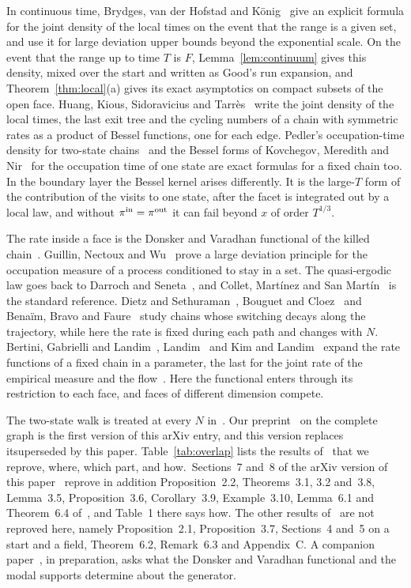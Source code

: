 In continuous time, Brydges, van der Hofstad and K\"onig~\cite{bhk2007} give an
explicit formula for the joint density of the local times on the event that the
range is a given set, and use it for large deviation upper bounds beyond the
exponential scale. On the event that the range up to time $T$ is $F$,
Lemma~\ref{lem:continuum} gives this density, mixed over the start and written
as Good's run expansion, and Theorem~\ref{thm:local}(a) gives its exact asymptotics
on compact subsets of the open face. Huang, Kious, Sidoravicius and
Tarr\`es~\cite{hkst2018} write the joint density of the local times, the last
exit tree and the cycling numbers of a chain with symmetric rates as a product
of Bessel functions, one for each edge. Pedler's occupation-time density for
two-state chains~\cite{pedler1971} and the Bessel forms of Kovchegov, Meredith
and Nir~\cite{kmn2010} for the occupation time of one state are exact formulas
for a fixed chain too. In the boundary layer the Bessel kernel arises
differently. It is the large-$T$ form of the contribution of the visits to one
state, after the facet is integrated out by a local law, and without
$\pi^{\rm in}=\pi^{\rm out}$ it can fail beyond $x$ of order $T^{1/3}$.

The rate inside a face is the Donsker and Varadhan functional of the killed
chain~\cite{dv1975,dupuisliu2015,chendeng2013}. Guillin, Nectoux and
Wu~\cite{gnw2024} prove a large deviation principle for the occupation measure
of a process conditioned to stay in a set. The quasi-ergodic law goes back to
Darroch and Seneta~\cite{darrochseneta1965,darrochseneta1967}, and Collet,
Mart\'inez and San Mart\'in~\cite{cmsm2013} is the standard reference. Dietz and
Sethuraman~\cite{dietz2007,dietz2005}, Bouguet and
Cloez~\cite{bouguetcloez2018} and Bena\"im, Bravo and Faure~\cite{bbf2026}
study chains whose switching decays along the trajectory, while here the rate is
fixed during each path and changes with $N$. Bertini, Gabrielli and
Landim~\cite{bgl2024}, Landim~\cite{landim2023} and Kim and Landim~\cite{kl2024}
expand the rate functions of a fixed chain in a parameter, the last for the
joint rate of the empirical measure and the flow~\cite{bfg2014,bfg2015}. Here
the functional enters through its restriction to each face, and faces of
different dimension compete.

The two-state walk is treated at every $N$ in~\cite{paperA}. Our
preprint~\cite{paperB} on the complete graph is \ifarxivbuild the first version
of this arXiv entry, and this version replaces it\else superseded by this
paper\fi. Table~\ref{tab:overlap} lists the results of \Bversion\ that we
reprove, where, which part, and how.\ifarxivbuild\else\ Sections~7 and~8 of the arXiv version of
this paper~\cite{arxivC1} reprove in addition Proposition~2.2, Theorems~3.1, 3.2 and~3.8,
Lemma~3.5, Proposition~3.6, Corollary~3.9, Example~3.10, Lemma~6.1 and Theorem~6.4
of~\cite{paperB}, and Table~1 there says how.\fi{} The other results of~\cite{paperB} are not
reproved here, namely Proposition~2.1, Proposition~3.7, Sections~4 and~5 on a
start and a field, Theorem~6.2, Remark~6.3 and Appendix~C. A companion
paper\ifarxivbuild~\cite{paperC2}\else, in preparation,\fi{} asks what the Donsker and Varadhan functional and the modal
supports determine about the generator.

